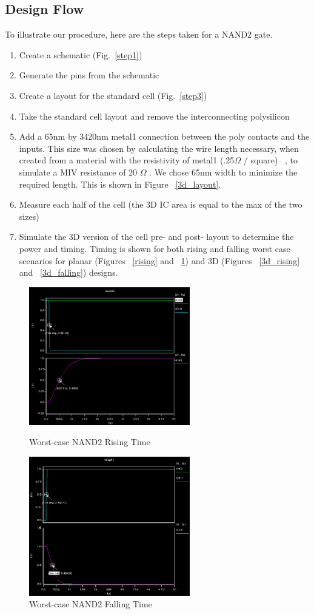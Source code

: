\documentclass{article}
\begin{document}
\subsection{Design Flow} To illustrate our procedure, here are the steps taken for a NAND2 gate. 
	\begin{enumerate}
		\item Create a schematic (Fig.~\ref{step1})
		\item Generate the pins from the schematic
		\item Create a layout for the standard cell (Fig.~\ref{step3})
		\item Take the standard cell layout and remove the interconnecting polysilicon
		\item Add a 65nm by 3420nm metal1 connection between the poly contacts and the inputs. This size was chosen by calculating the wire length necessary, when created from a material with the resistivity of metal1 (.25$\Omega$ / square) ~\cite{NCSU}, to simulate a MIV resistance of 20 $\Omega$ \cite{ULTRA} . We chose 65nm width to minimize the required length.  This is shown in Figure ~\ref{3d_layout}.
		\item Measure each half of the cell (the 3D IC area is equal to the max of the two sizes)
		\item Simulate the 3D version of the cell pre- and post- layout to determine the power and timing. Timing is shown for both rising and falling worst case scenarios for planar (Figures ~\ref{rising} and ~\ref{falling}) and 3D (Figures ~\ref{3d_rising} and ~\ref{3d_falling}) designs.
	\end{enumerate}
\begin{figure}
\centering
\parbox{8cm}{
\includegraphics[width=7cm]{rising}
  \caption{Worst-case NAND2 Rising Time}
\label{rising}}
\qquad
\begin{minipage}{7cm}
\includegraphics[width=7cm]{falling}
  \caption{Worst-case NAND2 Falling Time}
\label{falling}
\end{minipage}
\end{figure}
\end{document}
